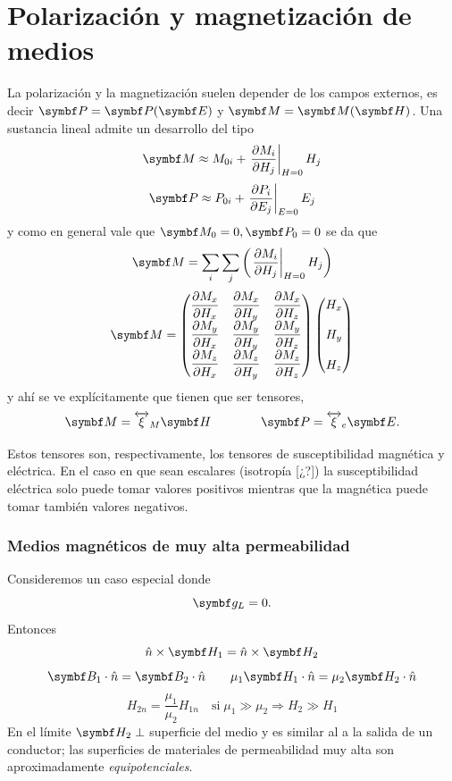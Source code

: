 \documentclass[10pt,oneside]{CBFT_book}
\begin{document}
\section{Polarización y magnetización de medios}

La polarización y la magnetización suelen depender de los campos externos, es decir 
$\vb{P}=\vb{P}(\vb{E})$ y $\vb{M}=\vb{M}(\vb{H})$.
Una sustancia lineal admite un desarrollo del tipo
\[
	\vb{M} \approx M_{0i} + \left.\dpar{M_i}{H_j}\right|_{H=0} H_j
\]
\[
	\vb{P} \approx P_{0i} + \left.\dpar{P_i}{E_j}\right|_{E=0} E_j
\]
y como en general vale que $\vb{M}_0=0, \vb{P}_0=0$  se da que 
\[
	\vb{M} = \sum_i \sum_j \left( \left.\dpar{M_i}{H_j}\right|_{H=0} H_j \right) 
\]
\[
	\vb{M} = 
	\begin{pmatrix}
	 \displaystyle{\dpar{M_x}{H_x}} & \displaystyle{\dpar{M_x}{H_y}} & \displaystyle{\dpar{M_x}{H_z}} \\
	 \displaystyle{\dpar{M_y}{H_x}} & \displaystyle{\dpar{M_y}{H_y}} & \displaystyle{\dpar{M_y}{H_z}} \\
	 \displaystyle{\dpar{M_z}{H_x}} & \displaystyle{\dpar{M_z}{H_y}} & \displaystyle{\dpar{M_z}{H_z}}
	\end{pmatrix}
	\begin{pmatrix}
	 \displaystyle{H_x} \\
	 \\
	 H_y \\
	 \\
	 H_z
	\end{pmatrix}
\]
y ahí se ve explícitamente que tienen que ser tensores,
\[
	\vb{M} = \overleftrightarrow{\xi}_M \vb{H} \qquad\qquad 
	\vb{P} =  \overleftrightarrow{\xi}_e \vb{E}.
\]

Estos tensores son, respectivamente, los tensores de susceptibilidad magnética y
eléctrica. En el caso en que sean escalares (isotropía [¿?]) la susceptibilidad
eléctrica solo puede tomar valores positivos mientras que la magnética puede
tomar también valores negativos.

\subsubsection{Medios magnéticos de muy alta permeabilidad}

Consideremos un caso especial donde
\[
	\vb{g}_L = 0.
\]
Entonces
\[
	\hat{n}\times\vb{H}_1 = \hat{n}\times\vb{H}_2
\]
\[
	\vb{B}_1\cdot\hat{n} = \vb{B}_2\cdot\hat{n} \qquad
		\mu_1\vb{H}_1\cdot\hat{n} = \mu_2\vb{H}_2\cdot\hat{n}
\]
\[
	H_{2n} = \frac{\mu_1}{\mu_2} H_{1n} \quad \text{si} \; \mu_1 \gg \mu_2 \Rightarrow H_2 \gg H_1
\]
En el límite $\vb{H}_2 \perp$ superficie del medio y es similar al  a la salida de un
conductor; las superficies de materiales de permeabilidad muy alta son aproximadamente {\it equipotenciales}.
\end{document}
